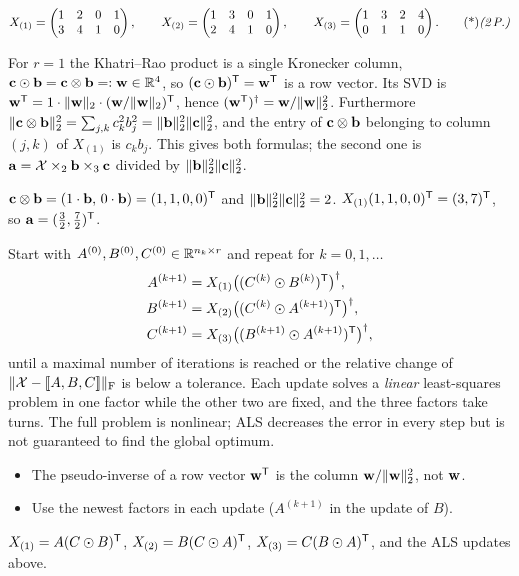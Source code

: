 \begin{solution}
\[
X_{(1)}=\begin{pmatrix}1&2&0&1\\3&4&1&0\end{pmatrix},\qquad
X_{(2)}=\begin{pmatrix}1&3&0&1\\2&4&1&0\end{pmatrix},\qquad
X_{(3)}=\begin{pmatrix}1&3&2&4\\0&1&1&0\end{pmatrix}.\ptd{2}
\]

 For $r=1$ the Khatri--Rao product is a single Kronecker column, $\mathbf{c}\odot\mathbf{b}=\mathbf{c}\otimes\mathbf{b}=:\mathbf{w}\in\mathbb{R}^4$, so $(\mathbf{c}\odot\mathbf{b})^{\mathsf{T}}=\mathbf{w}^{\mathsf{T}}$ is a row vector. Its SVD is $\mathbf{w}^{\mathsf{T}}=1\cdot\lVert \mathbf{w}\rVert_2\cdot(\mathbf{w}/\lVert \mathbf{w}\rVert_2)^{\mathsf{T}}$, hence $(\mathbf{w}^{\mathsf{T}})^\dagger=\mathbf{w}/\lVert \mathbf{w}\rVert_2^2$. 
Furthermore $\lVert \mathbf{c}\otimes\mathbf{b}\rVert_2^2=\sum_{j,k}c_k^2b_j^2=\lVert \mathbf{b}\rVert_2^2\lVert \mathbf{c}\rVert_2^2$, and the entry of $\mathbf{c}\otimes\mathbf{b}$ belonging to column $(j,k)$ of $X_{(1)}$ is $c_kb_j$. This gives both formulas; the second one is $\mathbf{a}=\mathcal{X}\times_2\mathbf{b}\times_3\mathbf{c}$ divided by $\lVert \mathbf{b}\rVert_2^2\lVert \mathbf{c}\rVert_2^2$. 

 $\mathbf{c}\otimes\mathbf{b}=(1\cdot\mathbf{b},\,0\cdot\mathbf{b})=(1,1,0,0)^{\mathsf{T}}$ and $\lVert \mathbf{b}\rVert_2^2\lVert \mathbf{c}\rVert_2^2=2$. 
$X_{(1)}(1,1,0,0)^{\mathsf{T}}=(3,7)^{\mathsf{T}}$, so $\mathbf{a}=(\frac32,\frac72)^{\mathsf{T}}$. 

 Start with $A^{(0)},B^{(0)},C^{(0)}\in\mathbb{R}^{n_k\times r}$ and repeat for $k=0,1,\dots$
\begin{align*}
A^{(k+1)}&=X_{(1)}\big((C^{(k)}\odot B^{(k)})^{\mathsf{T}}\big)^\dagger,\\
B^{(k+1)}&=X_{(2)}\big((C^{(k)}\odot A^{(k+1)})^{\mathsf{T}}\big)^\dagger,\\
C^{(k+1)}&=X_{(3)}\big((B^{(k+1)}\odot A^{(k+1)})^{\mathsf{T}}\big)^\dagger,
\end{align*}
until a maximal number of iterations is reached or the relative change of $\lVert \mathcal{X}-[\![A,B,C]\!]\rVert_{\mathrm F}$ is below a tolerance. 
Each update solves a \emph{linear} least-squares problem in one factor while the other two are fixed, and the three factors take turns. The full problem is nonlinear; ALS decreases the error in every step but is not guaranteed to find the global optimum. 

\begin{trap}
\begin{itemize}
\item The pseudo-inverse of a row vector $\mathbf{w}^{\mathsf{T}}$ is the column $\mathbf{w}/\lVert \mathbf{w}\rVert_2^2$, not $\mathbf{w}$.
\item Use the newest factors in each update ($A^{(k+1)}$ in the update of $B$).
\end{itemize}
\end{trap}
\begin{heart}
$X_{(1)}=A(C\odot B)^{\mathsf{T}}$, $X_{(2)}=B(C\odot A)^{\mathsf{T}}$, $X_{(3)}=C(B\odot A)^{\mathsf{T}}$, and the ALS updates above.
\end{heart}
\end{solution}

